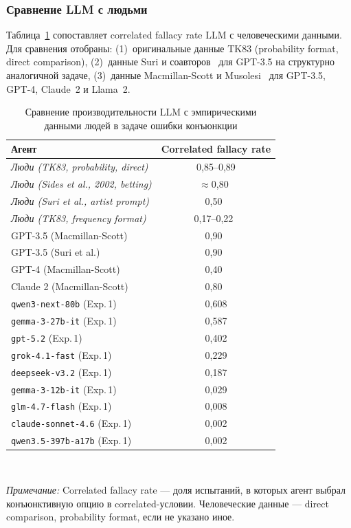 \subsubsection*{Сравнение LLM с людьми}

Таблица~\ref{tab:human_llm_linda} сопоставляет correlated fallacy rate LLM с человеческими данными. Для сравнения отобраны: (1)~оригинальные данные TK83 (probability format, direct comparison), (2)~данные Suri и соавторов~\cite{suri2024large} для GPT-3.5 на структурно аналогичной задаче, (3)~данные Macmillan-Scott и Musolesi~\cite{macmillan2024irrationality} для GPT-3.5, GPT-4, Claude~2 и Llama~2.

\begin{table}[h!]
\caption{Сравнение производительности LLM с эмпирическими данными людей в задаче ошибки конъюнкции}
\label{tab:human_llm_linda}
\centering
\begin{tabular}{|l|c|}
\hline
\textbf{Агент} & \textbf{Correlated fallacy rate} \\
\hline
\textit{Люди (TK83, probability, direct)} & 0{,}85--0{,}89 \\
\textit{Люди (Sides et al., 2002, betting)} & $\approx$0{,}80~\cite{sides2002reality} \\
\textit{Люди (Suri et al., artist prompt)} & 0{,}50~\cite{suri2024large} \\
\textit{Люди (TK83, frequency format)} & 0{,}17--0{,}22~\cite{fiedler1988dependence} \\
\hline
GPT-3.5 (Macmillan-Scott) & 0{,}90~\cite{macmillan2024irrationality} \\
GPT-3.5 (Suri et al.) & 0{,}90~\cite{suri2024large} \\
GPT-4 (Macmillan-Scott) & 0{,}40~\cite{macmillan2024irrationality} \\
Claude 2 (Macmillan-Scott) & 0{,}80~\cite{macmillan2024irrationality} \\
\hline
\texttt{qwen3-next-80b} (Exp.\,1) & 0{,}608 \\
\texttt{gemma-3-27b-it} (Exp.\,1) & 0{,}587 \\
\texttt{gpt-5.2} (Exp.\,1) & 0{,}402 \\
\texttt{grok-4.1-fast} (Exp.\,1) & 0{,}229 \\
\texttt{deepseek-v3.2} (Exp.\,1) & 0{,}187 \\
\texttt{gemma-3-12b-it} (Exp.\,1) & 0{,}029 \\
\texttt{glm-4.7-flash} (Exp.\,1) & 0{,}008 \\
\texttt{claude-sonnet-4.6} (Exp.\,1) & 0{,}002 \\
\texttt{qwen3.5-397b-a17b} (Exp.\,1) & 0{,}002 \\
\hline
\end{tabular}
\\[2pt]
\raggedright\footnotesize\textit{Примечание:} Correlated fallacy rate --- доля испытаний, в которых агент выбрал конъюнктивную опцию в correlated-условии. Человеческие данные --- direct comparison, probability format, если не указано иное.
\end{table}

